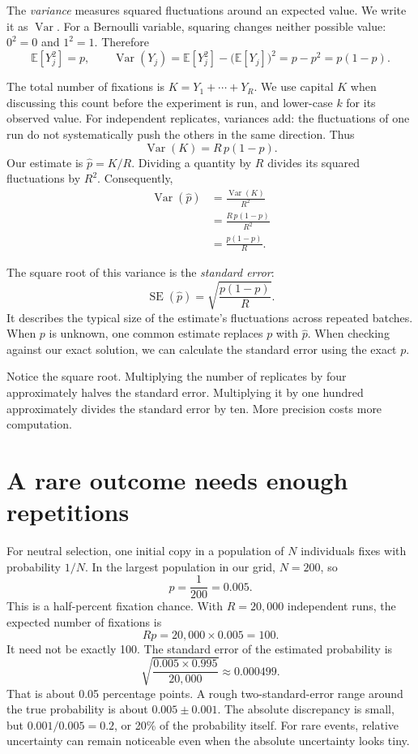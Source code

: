 The \emph{variance} measures squared fluctuations around an expected value. We write it as $\operatorname{Var}$. For a Bernoulli variable, squaring changes neither possible value: $0^2=0$ and $1^2=1$. Therefore
\[
\mathbb E[Y_j^2]=p,
\qquad
\operatorname{Var}(Y_j)
=\mathbb E[Y_j^2]-\bigl(\mathbb E[Y_j]\bigr)^2
=p-p^2=p(1-p).
\]

The total number of fixations is $K=Y_1+\cdots+Y_R$. We use capital $K$ when discussing this count before the experiment is run, and lower-case $k$ for its observed value. For independent replicates, variances add: the fluctuations of one run do not systematically push the others in the same direction. Thus
\[
\operatorname{Var}(K)=R\,p(1-p).
\]
Our estimate is $\widehat p=K/R$. Dividing a quantity by $R$ divides its squared fluctuations by $R^2$. Consequently,
\begin{align}
\operatorname{Var}(\widehat p)
&=\frac{\operatorname{Var}(K)}{R^2}\\
&=\frac{R\,p(1-p)}{R^2}\\
&=\frac{p(1-p)}{R}.
\label{eq:mc-variance}
\end{align}

The square root of this variance is the \emph{standard error}:
\begin{equation}
\operatorname{SE}(\widehat p)=\sqrt{\frac{p(1-p)}{R}}.
\label{eq:mc-se}
\end{equation}
It describes the typical size of the estimate's fluctuations across repeated batches. When $p$ is unknown, one common estimate replaces $p$ with $\widehat p$. When checking against our exact solution, we can calculate the standard error using the exact $p$.

Notice the square root. Multiplying the number of replicates by four approximately halves the standard error. Multiplying it by one hundred approximately divides the standard error by ten. More precision costs more computation.

\section{A rare outcome needs enough repetitions}

For neutral selection, one initial copy in a population of $N$ individuals fixes with probability $1/N$. In the largest population in our grid, $N=200$, so
\[
p=\frac{1}{200}=0.005.
\]
This is a half-percent fixation chance. With $R=20{,}000$ independent runs, the expected number of fixations is
\[
R p=20{,}000\times0.005=100.
\]
It need not be exactly 100. The standard error of the estimated probability is
\[
\sqrt{\frac{0.005\times0.995}{20{,}000}}
\approx0.000499.
\]
That is about 0.05 percentage points. A rough two-standard-error range around the true probability is about $0.005\pm0.001$. The absolute discrepancy is small, but $0.001/0.005=0.2$, or 20\% of the probability itself. For rare events, relative uncertainty can remain noticeable even when the absolute uncertainty looks tiny.

